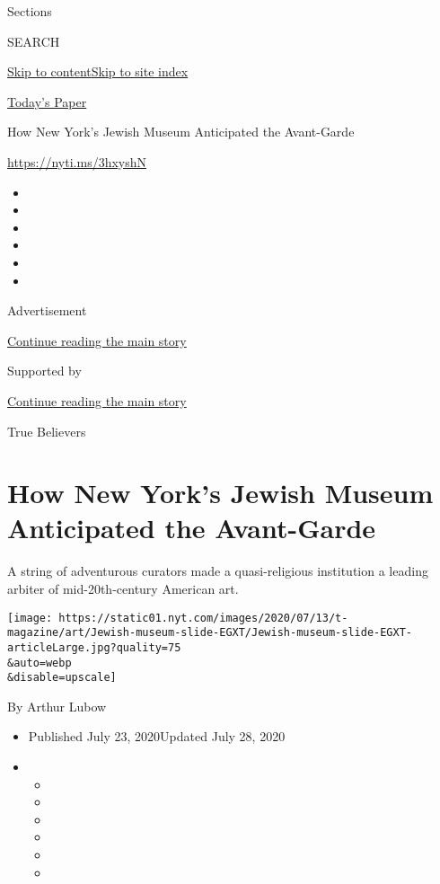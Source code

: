 Sections

SEARCH

\protect\hyperlink{site-content}{Skip to
content}\protect\hyperlink{site-index}{Skip to site index}

\href{https://myaccount.nytimes.com/auth/login?response_type=cookie\&client_id=vi}{}

\href{https://www.nytimes.com/section/todayspaper}{Today's Paper}

How New York's Jewish Museum Anticipated the Avant-Garde

\url{https://nyti.ms/3hxyshN}

\begin{itemize}
\item
\item
\item
\item
\item
\item
\end{itemize}

Advertisement

\protect\hyperlink{after-top}{Continue reading the main story}

Supported by

\protect\hyperlink{after-sponsor}{Continue reading the main story}

True Believers

\hypertarget{how-new-yorks-jewish-museum-anticipated-the-avant-garde}{%
\section{How New York's Jewish Museum Anticipated the
Avant-Garde}\label{how-new-yorks-jewish-museum-anticipated-the-avant-garde}}

A string of adventurous curators made a quasi-religious institution a
leading arbiter of mid-20th-century American art.

\texttt{[image: https://static01.nyt.com/images/2020/07/13/t-magazine/art/Jewish-museum-slide-EGXT/Jewish-museum-slide-EGXT-articleLarge.jpg?quality=75\\\&auto=webp\\\&disable=upscale]}

By Arthur Lubow

\begin{itemize}
\item
  Published July 23, 2020Updated July 28, 2020
\item
  \begin{itemize}
  \item
  \item
  \item
  \item
  \item
  \item
  \end{itemize}
\end{itemize}

